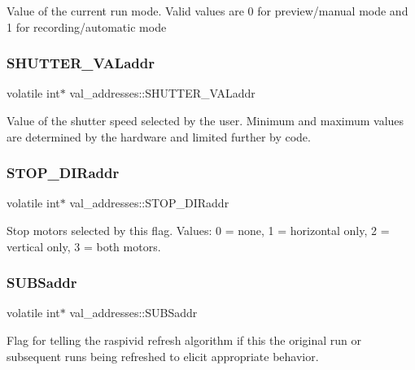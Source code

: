 Value of the current run mode. Valid values are 0 for preview/manual mode and 1 for recording/automatic mode \mbox{\label{structval__addresses_a57ee2cd54ae492b38aae06975b64b0e2}} 
\subsubsection{\texorpdfstring{S\+H\+U\+T\+T\+E\+R\+\_\+\+V\+A\+Laddr}{SHUTTER\_VALaddr}}
{\footnotesize\ttfamily volatile int$\ast$ val\+\_\+addresses\+::\+S\+H\+U\+T\+T\+E\+R\+\_\+\+V\+A\+Laddr}

Value of the shutter speed selected by the user. Minimum and maximum values are determined by the hardware and limited further by code. \mbox{\label{structval__addresses_ae9ae522d433f333dbb15a1ed5ebe70e6}} 
\subsubsection{\texorpdfstring{S\+T\+O\+P\+\_\+\+D\+I\+Raddr}{STOP\_DIRaddr}}
{\footnotesize\ttfamily volatile int$\ast$ val\+\_\+addresses\+::\+S\+T\+O\+P\+\_\+\+D\+I\+Raddr}

Stop motors selected by this flag. Values\+: 0 = none, 1 = horizontal only, 2 = vertical only, 3 = both motors. \mbox{\label{structval__addresses_a2dc7beaca139f55cee0def0170611e03}} 
\subsubsection{\texorpdfstring{S\+U\+B\+Saddr}{SUBSaddr}}
{\footnotesize\ttfamily volatile int$\ast$ val\+\_\+addresses\+::\+S\+U\+B\+Saddr}

Flag for telling the raspivid refresh algorithm if this the original run or subsequent runs being refreshed to elicit appropriate behavior. \mbox{\label{structval__addresses_a0bc3ea6915b32a17b4c333b865c81ea9}} 
